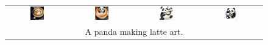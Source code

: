 \begin{figure}[ht!]
\begin{tabular}{cccc}
        \includegraphics[width=0.24\textwidth]{figures/cross/latte_0.jpg} &
        \includegraphics[width=0.24\textwidth]{figures/cross/latte_1.jpg} &
        \includegraphics[width=0.24\textwidth]{figures/cross/latte_2.jpg} &
        \includegraphics[width=0.24\textwidth]{figures/cross/latte_3.jpg} \vspace{-1mm}\\
        \multicolumn{4}{c}{\small A panda making latte art.}\\
        

\end{tabular}
\end{figure}
